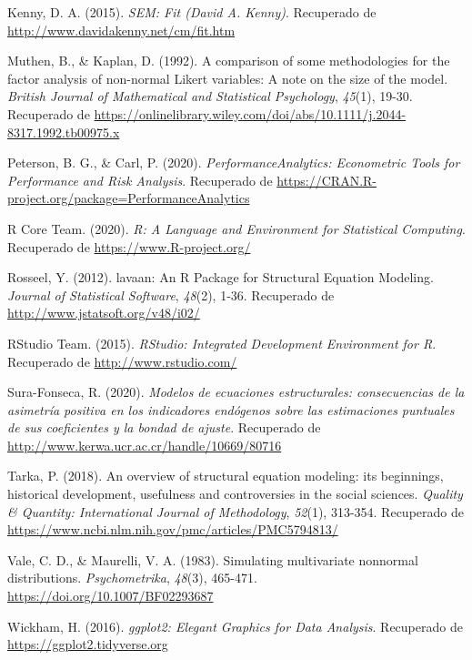\documentclass[
]{article}
\begin{document}
\leavevmode\hypertarget{ref-Kenny2015}{}%
Kenny, D. A. (2015). \emph{SEM: Fit (David A. Kenny)}. Recuperado de
\url{http://www.davidakenny.net/cm/fit.htm}

\leavevmode\hypertarget{ref-muthen}{}%
Muthen, B., \& Kaplan, D. (1992). A comparison of some methodologies for
the factor analysis of non-normal Likert variables: A note on the size
of the model. \emph{British Journal of Mathematical and Statistical
Psychology}, \emph{45}(1), 19-30. Recuperado de
\url{https://onlinelibrary.wiley.com/doi/abs/10.1111/j.2044-8317.1992.tb00975.x}

\leavevmode\hypertarget{ref-PerformanceAnalytics}{}%
Peterson, B. G., \& Carl, P. (2020). \emph{PerformanceAnalytics:
Econometric Tools for Performance and Risk Analysis}. Recuperado de
\url{https://CRAN.R-project.org/package=PerformanceAnalytics}

\leavevmode\hypertarget{ref-R}{}%
R Core Team. (2020). \emph{R: A Language and Environment for Statistical
Computing}. Recuperado de \url{https://www.R-project.org/}

\leavevmode\hypertarget{ref-lavaan}{}%
Rosseel, Y. (2012). lavaan: An R Package for Structural Equation
Modeling. \emph{Journal of Statistical Software}, \emph{48}(2), 1-36.
Recuperado de \url{http://www.jstatsoft.org/v48/i02/}

\leavevmode\hypertarget{ref-RStudio}{}%
RStudio Team. (2015). \emph{RStudio: Integrated Development Environment
for R}. Recuperado de \url{http://www.rstudio.com/}

\leavevmode\hypertarget{ref-sura}{}%
Sura-Fonseca, R. (2020). \emph{Modelos de ecuaciones estructurales:
consecuencias de la asimetría positiva en los indicadores endógenos
sobre las estimaciones puntuales de sus coeficientes y la bondad de
ajuste}. Recuperado de
\url{http://www.kerwa.ucr.ac.cr/handle/10669/80716}

\leavevmode\hypertarget{ref-Tarka}{}%
Tarka, P. (2018). An overview of structural equation modeling: its
beginnings, historical development, usefulness and controversies in the
social sciences. \emph{Quality \& Quantity: International Journal of
Methodology}, \emph{52}(1), 313-354. Recuperado de
\url{https://www.ncbi.nlm.nih.gov/pmc/articles/PMC5794813/}

\leavevmode\hypertarget{ref-Vale1983}{}%
Vale, C. D., \& Maurelli, V. A. (1983). Simulating multivariate
nonnormal distributions. \emph{Psychometrika}, \emph{48}(3), 465-471.
\url{https://doi.org/10.1007/BF02293687}

\leavevmode\hypertarget{ref-ggplot2}{}%
Wickham, H. (2016). \emph{ggplot2: Elegant Graphics for Data Analysis}.
Recuperado de \url{https://ggplot2.tidyverse.org}
\end{document}
